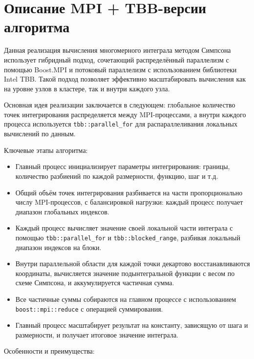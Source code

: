 \documentclass[a4paper,12pt]{article}
\begin{document}
\section{Описание MPI + TBB-версии алгоритма}

Данная реализация вычисления многомерного интеграла методом Симпсона использует гибридный подход, сочетающий распределённый параллелизм с помощью Boost.MPI и потоковый параллелизм с использованием библиотеки Intel TBB. Такой подход позволяет эффективно масштабировать вычисления как на уровне узлов в кластере, так и внутри каждого узла.

Основная идея реализации заключается в следующем: глобальное количество точек интегрирования распределяется между MPI-процессами, а внутри каждого процесса используется \texttt{tbb::parallel\_for} для распараллеливания локальных вычислений по данным.

Ключевые этапы алгоритма:

\begin{itemize}
    \item Главный процесс инициализирует параметры интегрирования: границы, количество разбиений по каждой размерности, функцию, шаг и т.д.
    
    \item Общий объём точек интегрирования разбивается на части пропорционально числу MPI-процессов, с балансировкой нагрузки: каждый процесс получает диапазон глобальных индексов.
    
    \item Каждый процесс вычисляет значение своей локальной части интеграла с помощью \texttt{tbb::parallel\_for} и \texttt{tbb::blocked\_range}, разбивая локальный диапазон индексов на блоки.
    
    \item Внутри параллельной области для каждой точки декартово восстанавливаются координаты, вычисляется значение подынтегральной функции с весом по схеме Симпсона, и аккумулируется частичная сумма.
    
    \item Все частичные суммы собираются на главном процессе с использованием \texttt{boost::mpi::reduce} с операцией суммирования.
    
    \item Главный процесс масштабирует результат на константу, зависящую от шага и размерности, и получает итоговое значение интеграла.
\end{itemize}

Особенности и преимущества:
\end{document}
